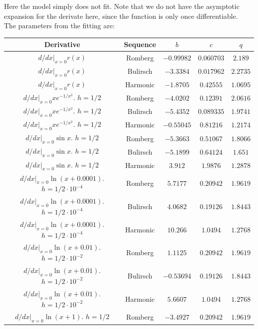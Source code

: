 Here the model simply does not fit. Note that we do not have the asymptotic expansion for the derivate here, since the function is only once differentiable.\\

The parameters from the fitting are:

\begin{table}[H]
    \centering
    \begin{tabular}{c|c||c|c|c}
        Derivative & Sequence & \(b\) & \(c\) & \(q\) \\\hline\hline
$d/dx|_{x=0}r(x)$ & Romberg & \(-0.99982\) & \(0.060703\) & \(2.189\) \\
$d/dx|_{x=0}r(x)$ & Bulirsch & \(-3.3384\) & \(0.017962\) & \(2.2735\) \\
$d/dx|_{x=0}r(x)$ & Harmonic & \(-1.8705\) & \(0.42555\) & \(1.0695\) \\
$d/dx|_{x=0}xe^{-1/x^2}$. $h=1/2$ & Romberg & \(-4.0202\) & \(0.12391\) & \(2.0616\) \\
$d/dx|_{x=0}xe^{-1/x^2}$. $h=1/2$ & Bulirsch & \(-5.4352\) & \(0.089335\) & \(1.9741\) \\
$d/dx|_{x=0}xe^{-1/x^2}$. $h=1/2$ & Harmonic & \(-0.55045\) & \(0.81216\) & \(1.2174\) \\
$d/dx|_{x=0}\sin x$. $h=1/2$ & Romberg & \(-5.3663\) & \(0.51067\) & \(1.8066\) \\
$d/dx|_{x=0}\sin x$. $h=1/2$ & Bulirsch & \(-5.1899\) & \(0.64124\) & \(1.651\) \\
$d/dx|_{x=0}\sin x$. $h=1/2$ & Harmonic & \(3.912\) & \(1.9876\) & \(1.2878\) \\
$d/dx|_{x = 0} \ln (x + 0.0001)$. $h=1/2\cdot 10^{-4}$ & Romberg & \(5.7177\) & \(0.20942\) & \(1.9619\) \\
$d/dx|_{x = 0} \ln (x + 0.0001)$. $h=1/2\cdot 10^{-4}$ & Bulirsch & \(4.0682\) & \(0.19126\) & \(1.8443\) \\
$d/dx|_{x = 0} \ln (x + 0.0001)$. $h=1/2\cdot 10^{-4}$ & Harmonic & \(10.266\) & \(1.0494\) & \(1.2768\) \\
$d/dx|_{x=0} \ln (x + 0.01)$. $h=1/2\cdot 10^{-2}$ & Romberg & \(1.1125\) & \(0.20942\) & \(1.9619\) \\
$d/dx|_{x=0} \ln (x + 0.01)$. $h=1/2\cdot 10^{-2}$ & Bulirsch & \(-0.53694\) & \(0.19126\) & \(1.8443\) \\
$d/dx|_{x=0} \ln (x + 0.01)$. $h=1/2\cdot 10^{-2}$ & Harmonic & \(5.6607\) & \(1.0494\) & \(1.2768\) \\
$d/dx|_{x=0} \ln(x + 1)$. $h=1/2$ & Romberg & \(-3.4927\) & \(0.20942\) & \(1.9619\) \\

\end{tabular}
\end{table}
